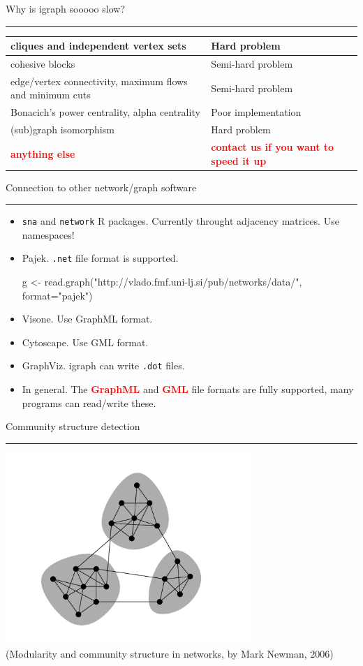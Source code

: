 \documentclass[landscape,fleqno]{foils}
\newcommand{\stitle}[1]{{\color{blue}\Large #1\par\vspace*{10pt}\hrule}}
\renewcommand{\emph}[1]{\textcolor{red}{\bf #1}}
\begin{document}
\newpage
\stitle{Why is igraph sooooo slow?}

\begin{tabularx}{\textwidth}{X|l}
cliques and independent vertex sets & Hard problem \\
\hline
cohesive blocks                     & Semi-hard problem \\
\hline
edge/vertex connectivity, maximum flows and minimum cuts & Semi-hard
                                      problem \\
\hline
Bonacich's power centrality, alpha centrality & Poor implementation \\
\hline
(sub)graph isomorphism & Hard problem \\
\hline
\emph{anything else} & \emph{contact us if you want to speed it up} \\
\end{tabularx}


\newpage
\stitle{Connection to other network/graph software}
\begin{itemize}
\item \texttt{sna} and \texttt{network} R packages. Currently throught
  adjacency matrices. Use namespaces!\pause
\item Pajek. \texttt{.net} file format is supported. \pause
\begin{Myverb}
  g <- read.graph("http://vlado.fmf.uni-lj.si/pub/networks/data/", 
       format="pajek")
\end{Myverb}
\pause
\item Visone. Use GraphML format. \pause
\item Cytoscape. Use GML format. \pause
\item GraphViz. igraph can write \texttt{.dot} files. \pause
\item In general. The \emph{GraphML} and \emph{GML} file formats 
  are fully supported, many programs can read/write these.
\end{itemize}

\newpage
\stitle{Community structure detection}
\begin{center}
\includegraphics[width=0.7\textwidth]{communities}\\
\small(Modularity and community structure in networks, by Mark Newman,
2006)
\end{center}
\end{document}
